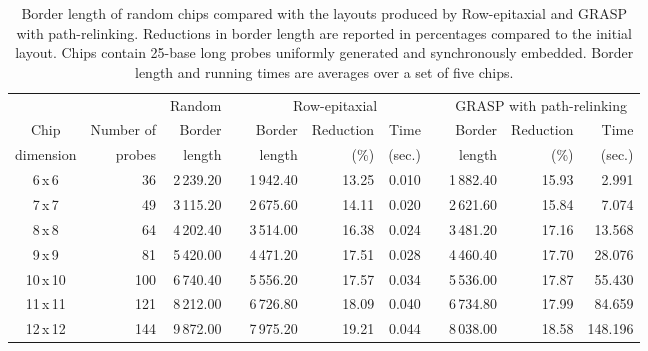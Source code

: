 \documentclass[english]{lni}
\begin{document}
\begin{table}[t]
\caption{Border length of random chips compared with the layouts produced by
Row-epitaxial and GRASP with path-relinking. Reductions in border length are
reported in percentages compared to the initial layout. Chips contain 25-base
long probes uniformly generated and synchronously embedded. Border length and
running times are averages over a set of five chips.\label{tab:graspr_reptx}}
\vspace*{2ex}
\scriptsize{
\begin{tabular}{crrcrrrcrrr}
          &            & Random & & \multicolumn{3}{c}{Row-epitaxial}  & & \multicolumn{3}{c}{GRASP with path-relinking}  \\ \cline{3-3} \cline{5-7} \cline{9-11}
Chip      & Number of  & Border & & Border & Reduction & Time          & & Border & Reduction & Time   \\
dimension & probes     & length & & length & (\%)      & (sec.)        & & length & (\%)      & (sec.) \\
\hline
6\,x\,6   &  36 & 2\,239.20 & & 1\,942.40 & 13.25 & 0.010 & & 1\,882.40 & 15.93 & 2.991   \\
7\,x\,7   &  49 & 3\,115.20 & & 2\,675.60 & 14.11 & 0.020 & & 2\,621.60 & 15.84 & 7.074   \\
8\,x\,8   &  64 & 4\,202.40 & & 3\,514.00 & 16.38 & 0.024 & & 3\,481.20 & 17.16 & 13.568  \\
9\,x\,9   &  81 & 5\,420.00 & & 4\,471.20 & 17.51 & 0.028 & & 4\,460.40 & 17.70 & 28.076  \\
10\,x\,10 & 100 & 6\,740.40 & & 5\,556.20 & 17.57 & 0.034 & & 5\,536.00 & 17.87 & 55.430  \\
11\,x\,11 & 121 & 8\,212.00 & & 6\,726.80 & 18.09 & 0.040 & & 6\,734.80 & 17.99 & 84.659  \\
12\,x\,12 & 144 & 9\,872.00 & & 7\,975.20 & 19.21 & 0.044 & & 8\,038.00 & 18.58 & 148.196 \\
\hline
\end{tabular}}
\end{table}
\end{document}
